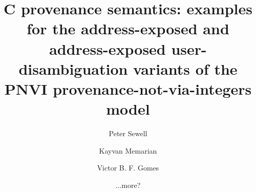 \documentclass[acmsmall,review,screen]{acmart}\settopmatter{printfolios=true,printccs=false,printacmref=false}
\newif\ifWGfourteennumber
\begin{document}
\ifWGfourteennumber
\fancypagestyle{firstpagestyle}{%
\fancyhf{} %
\fancyhead[C]{ISO/IEC JTC1/SC22/WG14 N2311, 2018-11-09} %
\renewcommand{\headrulewidth}{0pt}
\renewcommand{\footrulewidth}{0pt}}
\thispagestyle{plain}
\fi

\title[PNVI-ae and PNVI-ae-udi: Examples]{C provenance semantics: examples
for the
address-exposed and address-exposed 
user-disambiguation variants of the PNVI provenance-not-via-integers
model}


\authorsaddresses{}



\author{Peter Sewell}

 \author{Kayvan Memarian}
% 
% 
 \author{Victor B. F. Gomes}

 \author{...more?}

 
\renewcommand{\shortauthors}{Sewell, Memarian, Gomes}

\end{document}
